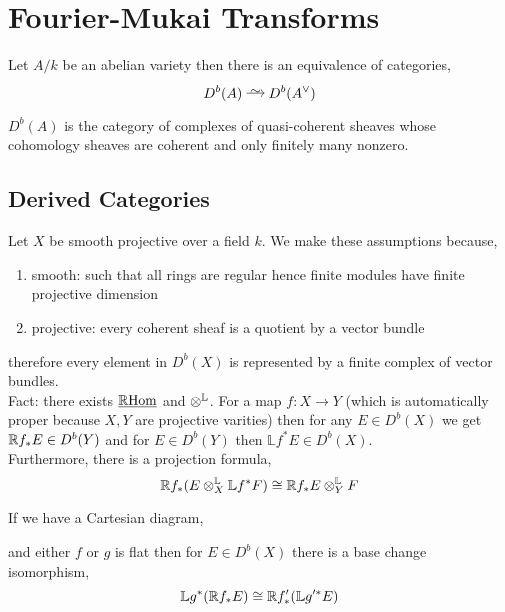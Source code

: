 \documentclass[12pt]{article}
\begin{document}
\section{Fourier-Mukai Transforms}

\begin{theorem}[Mukai]
Let $A/k$ be an abelian variety then there is an equivalence of categories,
\[ D^b(A) \iso D^b(A^\vee) \]
\end{theorem}

\begin{rmk}
$D^b(A)$ is the category of complexes of quasi-coherent sheaves whose cohomology sheaves are coherent and only finitely many nonzero.
\end{rmk}

\subsection{Derived Categories}

\renewcommand{\RHom}{\mathbb{R}\mathrm{Hom}}
\newcommand{\LL}{\mathbb{L}}

Let $X$ be smooth projective over a field $k$. We make these assumptions because,
\begin{enumerate}
\item smooth: such that all rings are regular hence finite modules have finite projective dimension
\item projective: every coherent sheaf is a quotient by a vector bundle
\end{enumerate}
therefore every element in $D^b(X)$ is represented by a finite complex of vector bundles.
\bigskip\\
Fact: there exists $\ul{\RHom}$ and $\ot^{\LL}$. For a map $f : X \to Y$ (which is automatically proper because $X,Y$ are projective varities) then for any $E \in D^b(X)$ we get $\mathbb{R} f_* E \in D^b(Y)$ and for $E \in D^b(Y)$ then $\LL f^* E \in D^b(X)$. 
\bigskip\\
Furthermore, there is a projection formula,
\[ \RR f_* (E \ot^{\LL}_X \LL f^* F) \cong \RR f_* E \ot^{\LL}_Y F \]

\begin{prop}
If we have a Cartesian diagram,
\begin{center}
\end{center}
and either $f$ or $g$ is flat then for $E \in D^b(X)$ there is a base change isomorphism,
\[ \LL g^* (\RR f_* E) \cong \RR f'_* (\LL g'^* E) \]
\end{prop}
\end{document}
